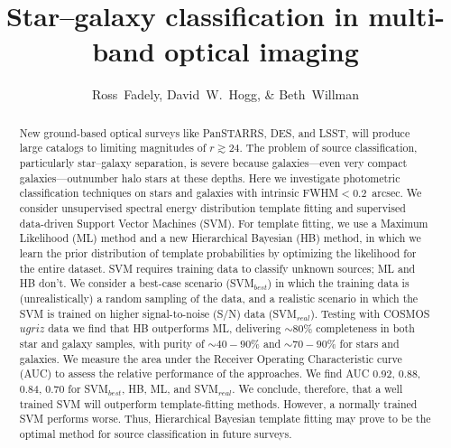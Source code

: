 \documentclass[12pt,preprint]{aastex}
\begin{document}
\title{Star--galaxy classification in multi-band optical imaging}
\author{Ross~Fadely,
        David~W.~Hogg,
        \& Beth~Willman}


%
%
\begin{abstract}
  New ground-based optical surveys like PanSTARRS, DES, and LSST, will
  produce large catalogs to limiting magnitudes of $r \gtrsim 24$.
  The problem of source classification, particularly star--galaxy
  separation, is severe because galaxies---even very compact
  galaxies---outnumber halo stars at these depths.  Here we
  investigate photometric classification techniques on stars and
  galaxies with intrinsic FWHM$<0.2$~arcsec.  We consider unsupervised
  spectral energy distribution template fitting and supervised
  data-driven Support Vector Machines (SVM).  For template fitting, we
  use a Maximum Likelihood (ML) method and a new Hierarchical Bayesian
  (HB) method, in which we learn the prior distribution of template
  probabilities by optimizing the likelihood for the entire dataset.
  SVM requires training data to classify unknown sources; ML and HB
  don't.  We consider a best-case scenario (SVM$_{best}$) in which the
  training data is (unrealistically) a random sampling of the data,
  and a realistic scenario in which the SVM is trained on higher
  signal-to-noise (S/N) data (SVM$_{real}$).  Testing with COSMOS
  $ugriz$ data we find that HB outperforms ML, delivering $\sim80\%$
  completeness in both star and galaxy samples, with purity of
  $\sim40-90\%$ and $\sim70-90\%$ for stars and galaxies.  We measure
  the area under the Receiver Operating Characteristic curve (AUC) to
  assess the relative performance of the approaches.  We find AUC
  0.92, 0.88, 0.84, 0.70 for SVM$_{best}$, HB, ML, and SVM$_{real}$.
  We conclude, therefore, that a well trained SVM will outperform
  template-fitting methods.  However, a normally trained SVM performs
  worse.  Thus, Hierarchical Bayesian template fitting may prove to be
  the optimal method for source classification in future surveys.
\end{abstract}
\end{document}
